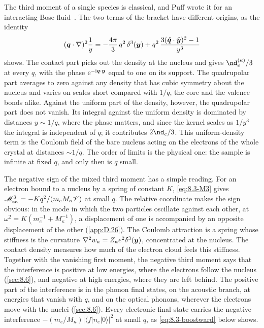\noindent The third moment of a single species is classical, and Puff wrote it for an interacting Bose fluid~\cite{puff1965application}. The two terms of the bracket have different origins, as the identity
\begin{equation*}
  (\bm{q}\cdot\nabla)^2\frac{1}{y} = -\frac{4\pi}{3}\,q^2\,\delta^3(\bm{y}) + q^2\,\frac{3(\hat{\bm{q}}\cdot\hat{\bm{y}})^2 - 1}{y^3}
\end{equation*}
shows. The contact part picks out the density at the nucleus and gives $\nd_e^{(\kappa)}/3$ at every $q$, with the phase $\mathrm{e}^{-\mathrm{i}\bm{q}\cdot\bm{y}}$ equal to one on its support. The quadrupolar part averages to zero against any density that has cubic symmetry about the nucleus and varies on scales short compared with $1/q$, the core and the valence bonds alike. Against the uniform part of the density, however, the quadrupolar part does not vanish. Its integral against the uniform density is dominated by distances $y \sim 1/q$, where the phase matters, and since the kernel scales as $1/y^3$ the integral is independent of $q$; it contributes $2\nd_e/3$. This uniform-density term is the Coulomb field of the bare nucleus acting on the electrons of the whole crystal at distances $\sim 1/q$. The order of limits is the physical one: the sample is infinite at fixed $q$, and only then is $q$ small.

The negative sign of the mixed third moment has a simple reading. For an electron bound to a nucleus by a spring of constant $K$, \cref{eq:8.3-M3} gives $\mathscr{M}^3_{e\kappa} = -Kq^2/(m_eM_\kappa \mathscr{V})$ at small $q$. The relative coordinate makes the sign obvious: in the mode in which the two particles oscillate against each other, at $\omega^2 = K(m_e^{-1} + M_\kappa^{-1})$, a displacement of one is accompanied by an opposite displacement of the other (\cref{app:D.26}). The Coulomb attraction is a spring whose stiffness is the curvature $\nabla^2w_\kappa = Z_\kappa e^2\delta^3(\bm{y})$, concentrated at the nucleus. The contact density measures how much of the electron cloud feels this stiffness. Together with the vanishing first moment, the negative third moment says that the interference is positive at low energies, where the electrons follow the nucleus (\cref{sec:8.6}), and negative at high energies, where they are left behind. The positive part of the interference is in the phonon final states, on the acoustic branch, at energies that vanish with $q$, and on the optical phonons, wherever the electrons move with the nuclei (\cref{sec:8.6}). Every electronic final state carries the negative interference $-(m_e/M_\kappa)|\langle f|n_e|0\rangle|^2$ at small $q$, as \cref{eq:8.3-boostward} below shows.

